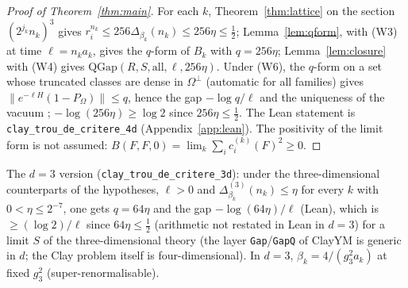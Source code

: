\documentclass[11pt,a4paper]{article}
\theoremstyle{plain}
\theoremstyle{definition}
\theoremstyle{remark}
\numberwithin{equation}{section}
\begin{document}
\begin{proof}[Proof of Theorem~\ref{thm:main}]
For each $k$, Theorem~\ref{thm:lattice} on the section $(2^{j_k}n_k)^3$ gives $r_i^{n_k}\le256\Delta_{\beta_k}(n_k)\le256\eta\le\frac12$;
Lemma~\ref{lem:qform}, with (W3) at time $\ell=n_ka_k$, gives the $q$-form of $B_k$ with $q=256\eta$; Lemma~\ref{lem:closure} with (W4)
gives $\mathrm{QGap}(R,S,\text{all},\ell,256\eta)$. Under (W6), the $q$-form on a set whose truncated classes are dense in
$\Omega^\perp$ (automatic for all families) gives $\|e^{-\ell H}(1-P_\Omega)\|\le q$, hence the gap $-\log q/\ell$ and the uniqueness of
the vacuum \cite[\texttt{QGap.hasMassGap\_univ}, \texttt{QGap.vacuum\_unique}]{ClayYM}; $-\log(256\eta)\ge\log2$ since $256\eta\le\frac12$.
The Lean statement is \texttt{clay\_trou\_de\_critere\_4d} (Appendix~\ref{app:lean}). The positivity of the limit form is not assumed:
$B(F,F,0)=\lim_k\sum_ic_i^{(k)}(F)^2\ge0$.
\end{proof}

The $d=3$ version (\texttt{clay\_trou\_de\_critere\_3d}): under the three-dimensional counterparts of the hypotheses, $\ell>0$ and $\Delta^{(3)}_{\beta_k}(n_k)\le\eta$ for every $k$ with $0<\eta\le2^{-7}$, one gets $q=64\eta$ and the
gap $-\log(64\eta)/\ell$ (Lean), which is $\ge(\log2)/\ell$ since $64\eta\le\frac12$ (arithmetic not restated in Lean in $d=3$) for a limit $S$ of the three-dimensional theory (the layer \texttt{Gap}/\texttt{GapQ} of ClayYM is
generic in $d$; the Clay problem itself is four-dimensional). In $d=3$, $\beta_k=4/(g_3^2a_k)$ at fixed $g_3^2$ (super-renormalisable).
\end{document}
